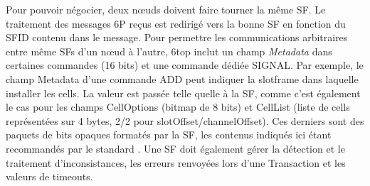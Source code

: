 \documentclass[]{report}
\begin{document}
\par Pour pouvoir négocier, deux nœuds doivent faire tourner la même SF. Le traitement des messages 6P reçus est redirigé vers la bonne SF en fonction du SFID contenu dans le message. Pour permettre les communications arbitraires entre même SFs d'un nœud à l'autre, 6top inclut un champ \textit{Metadata} dans certaines commandes (16 bits) et une commande dédiée SIGNAL. Par exemple, le champ Metadata d'une commande ADD peut indiquer la slotframe dans laquelle installer les cells. La valeur est passée telle quelle à la SF, comme c'est également le cas pour les champs CellOptions (bitmap de 8 bits) et CellList (liste de cells représentées sur 4 bytes, 2/2 pour slotOffset/channelOffset). Ces derniers sont des paquets de bits opaques formatés par la SF, les contenus indiqués ici étant recommandés par le standard \cite{rfc8480}. Une SF doit également gérer la détection et le traitement d'inconsistances, les erreurs renvoyées lors d'une Transaction et les valeurs de timeouts.
\end{document}
